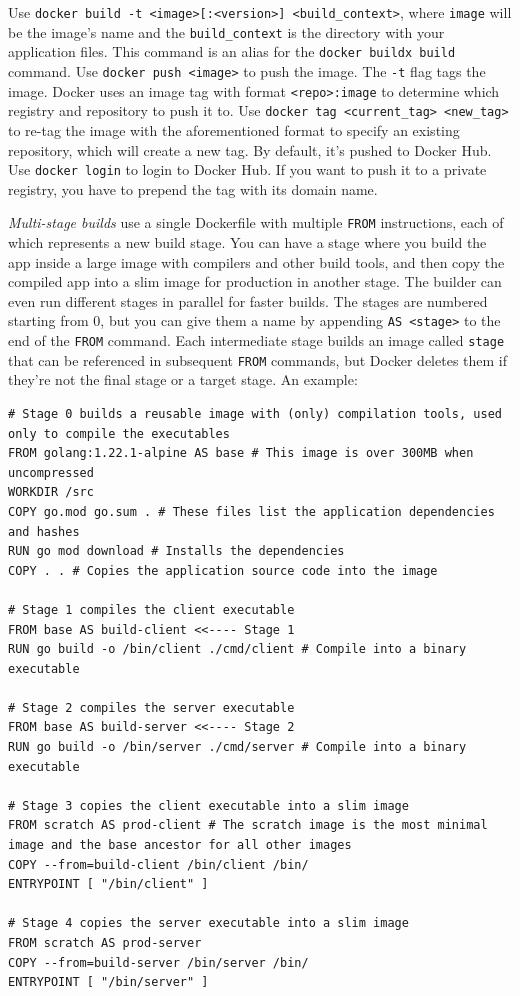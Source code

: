 \documentclass[table, xcdraw]{article}%
\begin{document}
Use \texttt{docker build -t <image>[:<version>] <build_context>}, where \texttt{image} will be the image's name and the \texttt{build_context} is the directory with your application files. This command is an alias for the \texttt{docker buildx build} command. Use \texttt{docker push <image>} to push the image. The \texttt{-t} flag tags the image. Docker uses an image tag with format \texttt{<repo>:image} to determine which registry and repository to push it to. Use \texttt{docker tag <current_tag> <new_tag>} to re-tag the image with the aforementioned format to specify an existing repository, which will create a new tag. By default, it's pushed to Docker Hub. Use \texttt{docker login} to login to Docker Hub. If you want to push it to a private registry, you have to prepend the tag with its domain name.

\emph{Multi-stage builds} use a single Dockerfile with multiple \texttt{FROM} instructions, each of which represents a new build stage. You can have a stage where you build the app inside a large image with compilers and other build tools, and then copy the compiled app into a slim image for production in another stage. The builder can even run different stages in parallel for faster builds. The stages are numbered starting from 0, but you can give them a name by appending \texttt{AS <stage>} to the end of the \texttt{FROM} command. Each intermediate stage builds an image called \texttt{stage} that can be referenced in subsequent \texttt{FROM} commands, but Docker deletes them if they're not the final stage or a target stage. An example:

\begin{verbatim}
# Stage 0 builds a reusable image with (only) compilation tools, used only to compile the executables
FROM golang:1.22.1-alpine AS base # This image is over 300MB when uncompressed
WORKDIR /src
COPY go.mod go.sum . # These files list the application dependencies and hashes
RUN go mod download # Installs the dependencies
COPY . . # Copies the application source code into the image

# Stage 1 compiles the client executable
FROM base AS build-client <<---- Stage 1
RUN go build -o /bin/client ./cmd/client # Compile into a binary executable

# Stage 2 compiles the server executable
FROM base AS build-server <<---- Stage 2
RUN go build -o /bin/server ./cmd/server # Compile into a binary executable

# Stage 3 copies the client executable into a slim image
FROM scratch AS prod-client # The scratch image is the most minimal image and the base ancestor for all other images
COPY --from=build-client /bin/client /bin/
ENTRYPOINT [ "/bin/client" ]

# Stage 4 copies the server executable into a slim image
FROM scratch AS prod-server
COPY --from=build-server /bin/server /bin/
ENTRYPOINT [ "/bin/server" ]
\end{verbatim}
\end{document}
